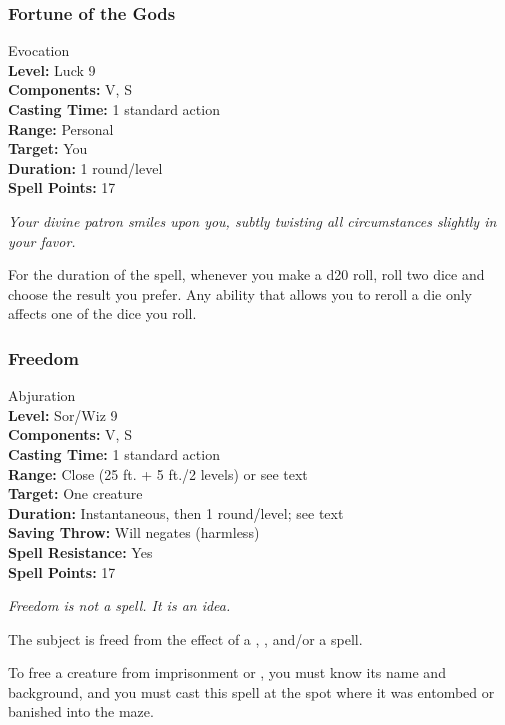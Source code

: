 
\subsubsection{Fortune of the Gods}
\label{Spell:FortuneOfTheGods}
Evocation
\\ \textbf{Level:} Luck 9
\\ \textbf{Components:} V, S
\\ \textbf{Casting Time:} 1 standard action
\\ \textbf{Range:} Personal
\\ \textbf{Target:} You
\\ \textbf{Duration:} 1 round/level
\\ \textbf{Spell Points:} 17

\emph{Your divine patron smiles upon you, subtly twisting all circumstances slightly in your favor.}

For the duration of the spell, whenever you make a d20 roll, roll two dice and choose the result you prefer. Any ability that allows you to reroll a die only affects one of the dice you roll.

\subsubsection{Freedom}
\label{Spell:Freedom}
Abjuration
\\ \textbf{Level:} Sor/Wiz 9
\\ \textbf{Components:} V, S
\\ \textbf{Casting Time:} 1 standard action
\\ \textbf{Range:} Close (25 ft. + 5 ft./2 levels) or see text
\\ \textbf{Target:} One creature
\\ \textbf{Duration:} Instantaneous, then 1 round/level; see text
\\ \textbf{Saving Throw:} Will negates (harmless)
\\ \textbf{Spell Resistance:} Yes
\\ \textbf{Spell Points:} 17

\emph{Freedom is not a spell. It is an idea.}

The subject is freed from the effect of a , ,  and/or a  spell.

To free a creature from imprisonment or , 
you must know its name and background, and you must cast this spell at the spot where it was entombed or banished into the maze.

